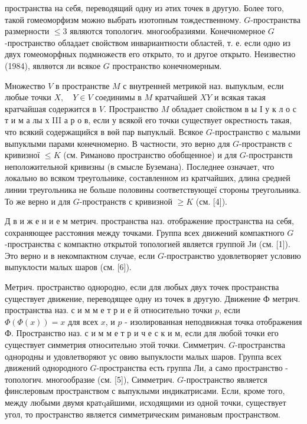 \documentclass[10pt]{article}
\begin{document}
пространства на себя, переводящий одну из әтих точек в другую. Более того, такой гомеоморфизм можно выбрать изотопным тождественному. $G$-пространства размерности $\leqslant 3$ являются топологич. многообразиями. Конечномерное $G$-пространство обладает свойством инвариантности областей, т. е. если одно из двух гомеоморфных подмножеств его открыто, то и другое открыто. Неизвестно (1984), являөтся ли всякое $G$ пространство конечномерным.



Множество $V$ в пространстве $M$ с внутренней метрикой наз. выпуклым, если любые точки $X, \quad Y \in V$ соединимы в $M$ кратчайшей $X Y$ и всякая такая кратчайшая содержится в $V$. Пространство $M$ обладает свойством в ы І у к л о с т и м а лы х III а р о в, если у всякой его точки существует окрестность такая, что всякий содержащийся в вөй пар выпуклый. Всякое $G$-пространство с малыми выпуклыми парами конечномерно. В частности, это верно для $G$-пространств с кривизної $\leqslant K$ (см. Риманово пространство обобщенное) и для $G$-пространств неположительной кривизны (в смысле Буземана). Последнее означает, что локально во всяком треугольнике, составленном из кратчайших, длина средней линии треугольника не больше половины соответствующеї стороны треугольника. То же верно и для $G$-пространств с кривизной $\geqslant K$ (см. [4]).



Д в и ж е н и е м метрич. пространства наз. отображение пространства на себя, сохраняющее расстояния между точками. Группа всех движений компактного $G$-пространства с компактно открытой топологией является группой Jи (см. [1]). Это верно и в некомпактном случае, если $G$-пространство удовлетворяет условию выпуклости малых шаров (см. [6]).



Метрич. пространство однородно, если для любых двух точек пространства существует движение, переводящее одну из точек в другую. Движение Ф метрич. пространства наз. с и м м е т р и е й относительно точки $p$, если $\Phi(\Phi(x))=x$ для всех $x$, и $p$ - изолированная неподвижная точка отображения Ф. Пространство наз. с и м м е т р и ч е с к и м, если для любой точки его существует симметрия относительно этой точки. Симметрич. $G$-пространства однородны и удовлетворяют ус овию выпуклости малых шаров. Группа всех движений однородного $G$-пространства есть группа Ли, а само пространство - топологич. многообразие (см. [5]), Симметрич. $G$-пространство является финслеровым пространством с выпуклыми индикатрисами. Если, кроме того, между любыми двумя кратqайшими, исходящими из одной точки, существует угол, то пространство является симметрическим римановым пространством.
\end{document}
